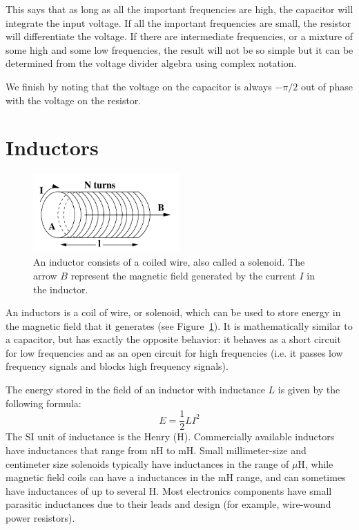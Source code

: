 \documentclass{article}
\begin{document}
This says that as long as all the important frequencies are high, the capacitor will integrate the input voltage. If all the important frequencies are small, the resistor will differentiate the voltage. If there are intermediate frequencies, or a mixture of some high and some low frequencies, the result will not be so simple but it can be determined from the voltage divider algebra using complex notation.

We finish by noting that the voltage on the capacitor is always $-\pi/2$ out of phase with the voltage on the resistor.

\section{Inductors}

\begin{figure}
\begin{center}
\includegraphics[width=0.5\textwidth]{pics/inductor}
\end{center}
\caption{An inductor consists of a coiled wire, also called a solenoid. The arrow $B$ represent the magnetic field generated by the current $I$ in the inductor.}
\label{fig:inductor}
\end{figure}

An inductors is a coil of wire, or solenoid, which can be used to store energy in the magnetic field that it generates (see Figure~\ref{fig:inductor}). It is mathematically similar to a capacitor, but has exactly the opposite behavior: it behaves as a short circuit for low frequencies and as an open circuit for high frequencies (i.e. it passes low frequency signals and blocks high frequency signals).

The energy stored in the field of an inductor with inductance $L$ is given by the following formula:
\begin{equation}
 E = \frac{1}{2} L I^2
\end{equation}
The SI unit of inductance is the Henry (H). Commercially available inductors have inductances that range from nH to mH. Small millimeter-size and centimeter size solenoids typically have inductances in the range of $\mu$H, while magnetic field coils can have a inductances in the mH range, and can sometimes have inductances of up to several H. Most electronics components have small parasitic inductances due to their leads and design (for example, wire-wound power resistors).
\end{document}
